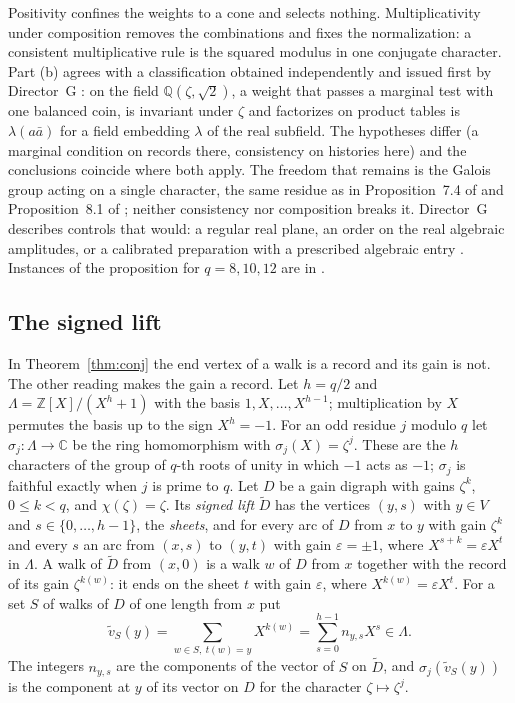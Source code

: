 Positivity confines the weights to a cone and selects nothing. Multiplicativity under composition removes the combinations and fixes the normalization: a consistent multiplicative rule is the squared modulus in one conjugate character. Part (b) agrees with a classification obtained independently and issued first by Director~G \cite{dg}: on the field $\mathbb{Q}(\zeta,\sqrt2)$, a weight that passes a marginal test with one balanced coin, is invariant under $\zeta$ and factorizes on product tables is $\lambda(a\bar a)$ for a field embedding $\lambda$ of the real subfield. The hypotheses differ (a marginal condition on records there, consistency on histories here) and the conclusions coincide where both apply. The freedom that remains is the Galois group acting on a single character, the same residue as in Proposition~7.4 of \cite{g7} and Proposition~8.1 of \cite{g8}; neither consistency nor composition breaks it. Director~G describes controls that would: a regular real plane, an order on the real algebraic amplitudes, or a calibrated preparation with a prescribed algebraic entry \cite{dg}. Instances of the proposition for $q=8,10,12$ are in \cite{comp4s}.

\subsection{The signed lift}
In Theorem~\ref{thm:conj} the end vertex of a walk is a record and its gain is not. The other reading makes the gain a record. Let $h=q/2$ and $\Lambda=\mathbb{Z}[X]/(X^h+1)$ with the basis $1,X,\dots,X^{h-1}$; multiplication by $X$ permutes the basis up to the sign $X^h=-1$. For an odd residue $j$ modulo $q$ let $\sigma_j\colon\Lambda\to\mathbb{C}$ be the ring homomorphism with $\sigma_j(X)=\zeta^j$. These are the $h$ characters of the group of $q$-th roots of unity in which $-1$ acts as $-1$; $\sigma_j$ is faithful exactly when $j$ is prime to $q$. Let $D$ be a gain digraph with gains $\zeta^k$, $0\le k<q$, and $\chi(\zeta)=\zeta$. Its \emph{signed lift} $\tilde D$ has the vertices $(y,s)$ with $y\in V$ and $s\in\{0,\dots,h-1\}$, the \emph{sheets}, and for every arc of $D$ from $x$ to $y$ with gain $\zeta^k$ and every $s$ an arc from $(x,s)$ to $(y,t)$ with gain $\varepsilon=\pm1$, where $X^{s+k}=\varepsilon X^t$ in $\Lambda$. A walk of $\tilde D$ from $(x,0)$ is a walk $w$ of $D$ from $x$ together with the record of its gain $\zeta^{k(w)}$: it ends on the sheet $t$ with gain $\varepsilon$, where $X^{k(w)}=\varepsilon X^t$. For a set $S$ of walks of $D$ of one length from $x$ put
\[
\tilde v_S(y)=\sum_{w\in S,\ t(w)=y}X^{k(w)}=\sum_{s=0}^{h-1}n_{y,s}X^s\in\Lambda .
\]
The integers $n_{y,s}$ are the components of the vector of $S$ on $\tilde D$, and $\sigma_j(\tilde v_S(y))$ is the component at $y$ of its vector on $D$ for the character $\zeta\mapsto\zeta^j$.

